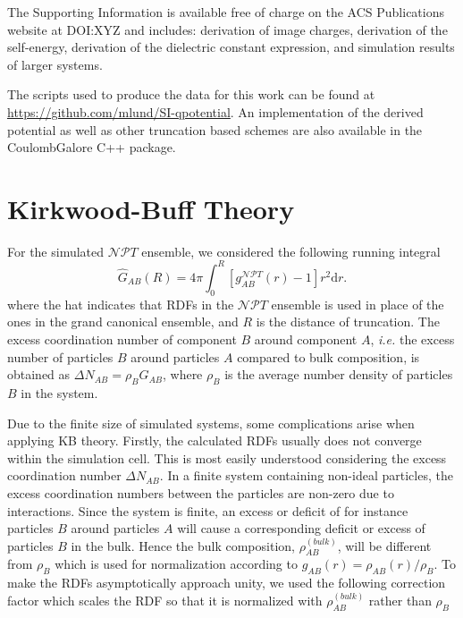 \documentclass[
journal=jctcce,
manuscript=letter]{achemso}
\begin{document}
\suppinfo
The Supporting Information is available free of charge on the ACS Publications website at DOI:XYZ and includes: derivation of image charges, derivation of the self-energy, derivation of the dielectric constant expression, and simulation results of larger systems. 

The scripts used to produce the data for this work can be found at \href{https://github.com/mlund/SI-qpotential}{https://github.com/mlund/SI-qpotential}. An implementation of the derived potential as well as other truncation based schemes are also available in the CoulombGalore C++ package\cite{CoulombGalore}.

\appendix

\section{Kirkwood-Buff Theory}\label{app:F}
For the simulated $\mathcal{N}\mathcal{P}T$ ensemble, we considered the following running integral
\begin{equation}
\hat{G}_{AB}(R) = 4{\pi}\int_{0}^{R}[g_{AB}^{\mathcal{N}\mathcal{P}T}(r)-1]r^2\textrm{d}r.
\label{eq:apprKBint}
\end{equation}
where the hat indicates that RDFs in the $\mathcal{N}\mathcal{P}T$ ensemble is used in place of the ones in the grand canonical ensemble, and $R$ is the distance of truncation.
The excess coordination number of component $B$ around component $A$, \emph{i.e.} the excess number of particles $B$ around particles $A$ compared to bulk composition, is obtained as $\Delta N_{AB}=\rho_{B}G_{AB}$, where $\rho_B$ is the average number density of particles $B$ in the system. 

Due to the finite size of simulated systems, some complications arise when applying KB theory. Firstly, the calculated RDFs usually does not converge within the simulation cell. This is most easily understood considering the excess coordination number $\Delta N_{AB}$. In a finite system containing non-ideal particles, the excess coordination numbers between the particles are non-zero due to interactions. Since the system is finite, an excess or deficit of for instance particles $B$ around particles $A$ will cause a corresponding deficit or excess of particles $B$ in the bulk. Hence the bulk composition, $\rho_{AB}^{(bulk)}$, will be different from $\rho_B$ which is used for normalization according to $g_{AB}(r)=\rho_{AB}(r)/\rho_B$. To make the RDFs asymptotically approach unity, we used the following correction factor \cite{Hess2009, Ganguly2013} which scales the RDF so that it is normalized with $\rho_{AB}^{(bulk)}$ rather than $\rho_B$ 
\end{document}
